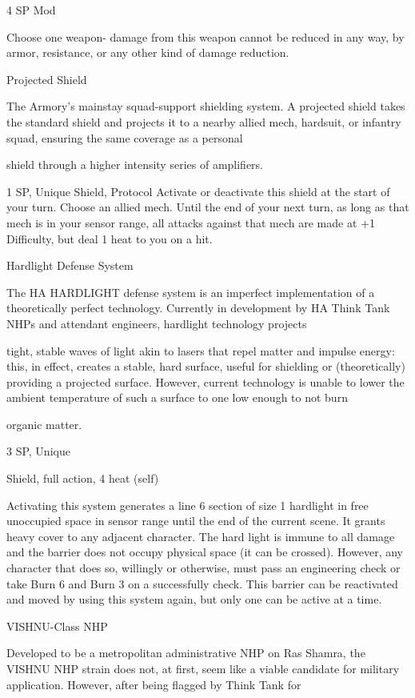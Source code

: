 4 SP  
Mod
 
Choose one weapon- damage from this weapon cannot be reduced in any way, by armor,  
resistance, or any other kind of damage reduction.
 

Projected Shield  

The Armory’s mainstay squad-support shielding system. A projected shield takes the standard shield and  
projects it to a nearby allied mech, hardsuit, or infantry squad, ensuring the same coverage as a personal  

shield through a higher intensity series of amplifiers.   

1 SP, Unique  
Shield, Protocol  
Activate or deactivate this shield at the start of your turn. Choose an allied mech. Until the end of  
your next turn, as long as that mech is in your sensor range, all attacks against that mech are  
made at +1 Difficulty, but deal 1 heat to you on a hit.
 

Hardlight Defense System  

The HA HARDLIGHT defense system is an imperfect implementation of a theoretically perfect technology.  
Currently in development by HA Think Tank NHPs and attendant engineers, hardlight technology projects  

tight, stable waves of light akin to lasers that repel matter and impulse energy: this, in effect, creates a  
stable, hard surface, useful for shielding or (theoretically) providing a projected surface. However, current  
technology is unable to lower the ambient temperature of such a surface to one low enough to not burn  

organic matter.  

3 SP, Unique  

Shield, full action, 4 heat (self)
 
Activating this system generates a line 6 section of size 1 hardlight in free unoccupied space in  
sensor range until the end of the current scene. It grants heavy cover to any adjacent character.  
The hard light is immune to all damage and the barrier does not occupy physical space (it can be  
crossed). However, any character that does so, willingly or otherwise, must pass an engineering  
check or take Burn 6 and Burn 3 on a successfully check. This barrier can be reactivated and  
moved by using this system again, but only one can be active at a time.
 

VISHNU-Class NHP  

Developed to be a metropolitan administrative NHP on Ras Shamra, the VISHNU NHP strain does not, at  
first, seem like a viable candidate for military application. However, after being flagged by Think Tank for  

